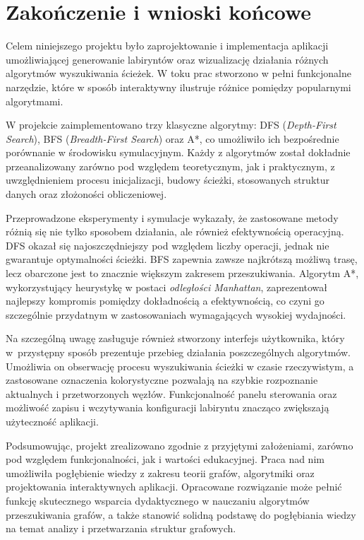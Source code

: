 \documentclass[../doc.tex]{subfiles}
\begin{document}
\section{Zakończenie i wnioski końcowe}

Celem niniejszego projektu było zaprojektowanie i implementacja aplikacji umożliwiającej generowanie labiryntów oraz wizualizację działania różnych algorytmów wyszukiwania ścieżek. W toku prac stworzono w pełni funkcjonalne narzędzie, które w sposób interaktywny ilustruje różnice pomiędzy popularnymi algorytmami.

W projekcie zaimplementowano trzy klasyczne algorytmy: DFS (\textit{Depth-First Search}), BFS (\textit{Breadth-First Search}) oraz A*, co umożliwiło ich bezpośrednie porównanie w środowisku symulacyjnym. Każdy z algorytmów został dokładnie przeanalizowany zarówno pod względem teoretycznym, jak i praktycznym, z uwzględnieniem procesu inicjalizacji, budowy ścieżki, stosowanych struktur danych oraz złożoności obliczeniowej.

Przeprowadzone eksperymenty i symulacje wykazały, że zastosowane metody różnią się nie tylko sposobem działania, ale również efektywnością operacyjną. DFS okazał się najoszczędniejszy pod względem liczby operacji, jednak nie gwarantuje optymalności ścieżki. BFS zapewnia zawsze najkrótszą możliwą trasę, lecz obarczone jest to znacznie większym zakresem przeszukiwania. Algorytm A*, wykorzystujący heurystykę w postaci \textit{odległości Manhattan}, zaprezentował najlepszy kompromis pomiędzy dokładnością a efektywnością, co czyni go szczególnie przydatnym w zastosowaniach wymagających wysokiej wydajności.

Na szczególną uwagę zasługuje również stworzony interfejs użytkownika, który w~przystępny sposób prezentuje przebieg działania poszczególnych algorytmów. Umożliwia on obserwację procesu wyszukiwania ścieżki w czasie rzeczywistym, a zastosowane oznaczenia kolorystyczne pozwalają na szybkie rozpoznanie aktualnych i przetworzonych węzłów. Funkcjonalność panelu sterowania oraz możliwość zapisu i wczytywania konfiguracji labiryntu znacząco zwiększają użyteczność aplikacji.

Podsumowując, projekt zrealizowano zgodnie z przyjętymi założeniami, zarówno pod względem funkcjonalności, jak i wartości edukacyjnej. Praca nad nim umożliwiła pogłębienie wiedzy z zakresu teorii grafów, algorytmiki oraz projektowania interaktywnych aplikacji. Opracowane rozwiązanie może pełnić funkcję skutecznego wsparcia dydaktycznego w nauczaniu algorytmów przeszukiwania grafów, a także stanowić solidną podstawę do pogłębiania wiedzy na temat analizy i przetwarzania struktur grafowych.
\end{document}
